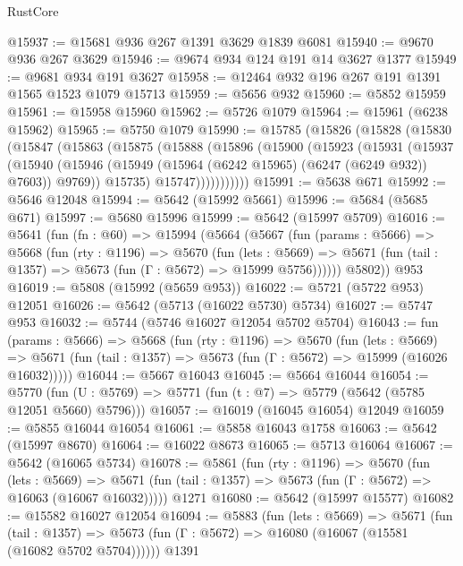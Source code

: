 \begin{lexlean}{RustCore}
\begin{coremodule}
@15937 := @15681 @936 @267 @1391 @3629 @1839 @6081
@15940 := @9670 @936 @267 @3629
@15946 := @9674 @934 @124 @191 @14 @3627 @1377
@15949 := @9681 @934 @191 @3627
@15958 := @12464 @932 @196 @267 @191 @1391 @1565 @1523 @1079 @15713
@15959 := @5656 @932
@15960 := @5852 @15959
@15961 := @15958 @15960
@15962 := @5726 @1079
@15964 := @15961 (@6238 @15962)
@15965 := @5750 @1079
@15990 := @15785
    (@15826
      (@15828
        (@15830
          (@15847
            (@15863
              (@15875
                (@15888
                  (@15896
                    (@15900
                      (@15923
                        (@15931
                          (@15937
                            (@15940
                              (@15946
                                (@15949 (@15964 (@6242 @15965) (@6247 (@6249 @932)) @7603))
                                @9769))
                            @15735)
                          @15747)))))))))))
@15991 := @5638 @671
@15992 := @5646 @12048
@15994 := @5642 (@15992 @5661)
@15996 := @5684 (@5685 @671)
@15997 := @5680 @15996
@15999 := @5642 (@15997 @5709)
@16016 := @5641
    (fun (fn : @60) =>
    @15994
      (@5664
        (@5667
          (fun (params : @5666) =>
          @5668
            (fun (rty : @1196) =>
            @5670
              (fun (lets : @5669) =>
              @5671 (fun (tail : @1357) => @5673 (fun (Γ : @5672) => @15999 @5756))))))
        @5802))
    @953
@16019 := @5808 (@15992 (@5659 @953))
@16022 := @5721 (@5722 @953) @12051
@16026 := @5642 (@5713 (@16022 @5730) @5734)
@16027 := @5747 @953
@16032 := @5744 (@5746 @16027 @12054 @5702 @5704)
@16043 := fun (params : @5666) =>
  @5668
    (fun (rty : @1196) =>
    @5670
      (fun (lets : @5669) =>
      @5671 (fun (tail : @1357) => @5673 (fun (Γ : @5672) => @15999 (@16026 @16032)))))
@16044 := @5667 @16043
@16045 := @5664 @16044
@16054 := @5770
    (fun (U : @5769) => @5771 (fun (t : @7) => @5779 (@5642 (@5785 @12051 @5660) @5796)))
@16057 := @16019 (@16045 @16054) @12049
@16059 := @5855 @16044 @16054
@16061 := @5858 @16043 @1758
@16063 := @5642 (@15997 @8670)
@16064 := @16022 @8673
@16065 := @5713 @16064
@16067 := @5642 (@16065 @5734)
@16078 := @5861
    (fun (rty : @1196) =>
    @5670
      (fun (lets : @5669) =>
      @5671 (fun (tail : @1357) => @5673 (fun (Γ : @5672) => @16063 (@16067 @16032)))))
    @1271
@16080 := @5642 (@15997 @15577)
@16082 := @15582 @16027 @12054
@16094 := @5883
    (fun (lets : @5669) =>
    @5671
      (fun (tail : @1357) =>
      @5673 (fun (Γ : @5672) => @16080 (@16067 (@15581 (@16082 @5702 @5704))))))
    @1391

\end{coremodule}
\end{lexlean}
